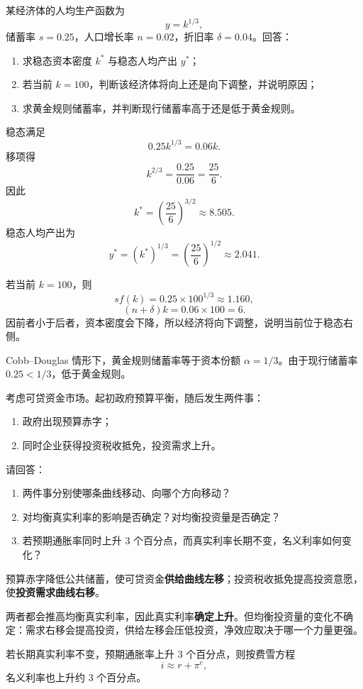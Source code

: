 \begin{question}
某经济体的人均生产函数为
\[
y=k^{1/3},
\]
储蓄率 $s=0.25$，人口增长率 $n=0.02$，折旧率 $\delta=0.04$。回答：
\begin{enumerate}[label=(\alph*),leftmargin=2.5em]
  \item 求稳态资本密度 $k^*$ 与稳态人均产出 $y^*$；
  \item 若当前 $k=100$，判断该经济体将向上还是向下调整，并说明原因；
  \item 求黄金规则储蓄率，并判断现行储蓄率高于还是低于黄金规则。
\end{enumerate}
\begin{solution}
稳态满足
\[
0.25k^{1/3}=0.06k.
\]
移项得
\[
k^{2/3}=\frac{0.25}{0.06}=\frac{25}{6}.
\]
因此
\[
k^*=\left(\frac{25}{6}\right)^{3/2}\approx 8.505.
\]
稳态人均产出为
\[
y^*=(k^*)^{1/3}=\left(\frac{25}{6}\right)^{1/2}\approx 2.041.
\]

若当前 $k=100$，则
\[
sf(k)=0.25\times 100^{1/3}\approx 1.160,
\]
\[
(n+\delta)k=0.06\times 100=6.
\]
因前者小于后者，资本密度会下降，所以经济将向下调整，说明当前位于稳态右侧。

Cobb--Douglas 情形下，黄金规则储蓄率等于资本份额 $\alpha=1/3$。由于现行储蓄率 $0.25<1/3$，低于黄金规则。
\end{solution}
\end{question}

\begin{question}
考虑可贷资金市场。起初政府预算平衡，随后发生两件事：
\begin{enumerate}[label=(\arabic*),leftmargin=2.5em]
  \item 政府出现预算赤字；
  \item 同时企业获得投资税收抵免，投资需求上升。
\end{enumerate}
请回答：
\begin{enumerate}[label=(\alph*),leftmargin=2.5em]
  \item 两件事分别使哪条曲线移动、向哪个方向移动？
  \item 对均衡真实利率的影响是否确定？对均衡投资量是否确定？
  \item 若预期通胀率同时上升 3 个百分点，而真实利率长期不变，名义利率如何变化？
\end{enumerate}
\begin{solution}
预算赤字降低公共储蓄，使可贷资金\textbf{供给曲线左移}；投资税收抵免提高投资意愿，使\textbf{投资需求曲线右移}。

两者都会推高均衡真实利率，因此真实利率\textbf{确定上升}。但均衡投资量的变化不确定：需求右移会提高投资，供给左移会压低投资，净效应取决于哪一个力量更强。

若长期真实利率不变，预期通胀率上升 3 个百分点，则按费雪方程
\[
i\approx r+\pi^e,
\]
名义利率也上升约 3 个百分点。\end{solution}
\end{question}

